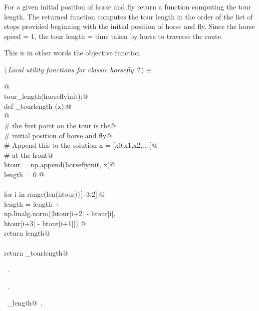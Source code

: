 \documentclass[11.5pt]{report}
\begin{document}
\newchunk  For a given initial position of horse and fly
   return a function computing the tour length. 
   The returned function computes the tour length 
   in the order of the list of stops provided beginning 
   with the initial position of horse and fly. Since 
   the horse speed = 1, the tour length = time taken 
   by horse to traverse the route.

   This is in other words the objective function. 

\begin{flushleft} \small\label{scrap41}\raggedright\small
{} $\langle\,${\itshape Local utility functions for classic horsefly}\nobreak\ {\footnotesize {?}}$\,\rangle\equiv$
\vspace{-1ex}
\begin{list}{}{} \item
\mbox{}\verb@   @\\
\mbox{}\verb@def tour_length(horseflyinit):@\\
\mbox{}\verb@   def _tourlength (x):@\\
\mbox{}\verb@         @\\
\mbox{}\verb@        # the first point on the tour is the@\\
\mbox{}\verb@        # initial position of horse and fly@\\
\mbox{}\verb@        # Append this to the solution x = [x0,x1,x2,....]@\\
\mbox{}\verb@        # at the front@\\
\mbox{}\verb@        htour = np.append(horseflyinit, x)@\\
\mbox{}\verb@        length = 0 @\\
\mbox{}\verb@@\\
\mbox{}\verb@        for i in range(len(htour))[:-3:2]:@\\
\mbox{}\verb@                length = length + \@\\
\mbox{}\verb@                         np.linalg.norm([htour[i+2] - htour[i], \@\\
\mbox{}\verb@                                         htour[i+3] - htour[i+1]]) @\\
\mbox{}\verb@        return length@\\
\mbox{}\verb@@\\
\mbox{}\verb@   return _tourlength@\\
\mbox{}\verb@@{\NWsep}
\end{list}
\vspace{-1.5ex}
\footnotesize
\begin{list}{}{\setlength{\itemsep}{-\parsep}\setlength{\itemindent}{-\leftmargin}}
\item \NWtxtMacroDefBy\ .
\item \NWtxtMacroRefIn\ .
\item \NWtxtIdentsDefed\nobreak\  \verb@tour_length@\nobreak\ .
\item{}
\end{list}
\vspace{4ex}
\end{flushleft}
\end{document}
